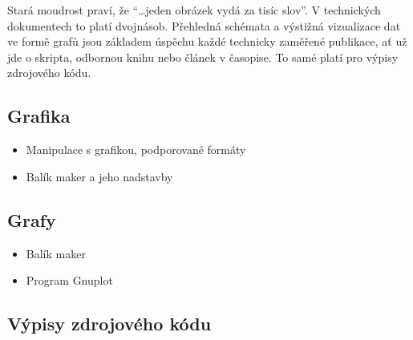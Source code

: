 {
	Stará moudrost praví, že \enquote{\ldots{}jeden obrázek vydá za tisíc slov}. V technických dokumentech to platí dvojnásob. Přehledná schémata a výstižná vizualizace dat ve formě grafů jsou základem úspěchu každé technicky zaměřené publikace, ať už jde o skripta, odbornou knihu nebo článek v časopise. To samé platí pro výpisy zdrojového kódu.
	\subsection*{Grafika}
	\begin{itemize}
		\item Manipulace s grafikou, podporované formáty
		\item Balík maker \TikZLogo{} a jeho nadstavby
	\end{itemize}
	\subsection*{Grafy}
	\begin{itemize}
		\item Balík maker \PgfPlotsLogo
		\item Program Gnuplot
	\end{itemize}
	\subsection*{Výpisy zdrojového kódu}
}
\endinput
